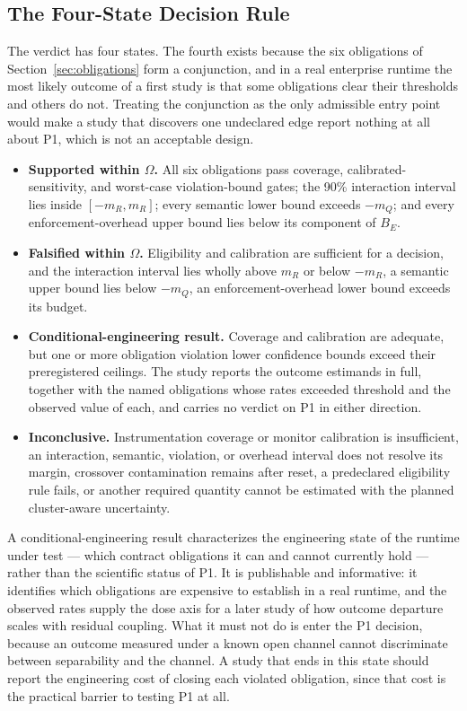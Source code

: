 \documentclass[11pt]{article}
\begin{document}
\subsection{The Four-State Decision Rule}
\label{sec:decision-rule}

The verdict has four states. The fourth exists because the six obligations of Section~\ref{sec:obligations} form a conjunction, and in a real enterprise runtime the most likely outcome of a first study is that some obligations clear their thresholds and others do not. Treating the conjunction as the only admissible entry point would make a study that discovers one undeclared edge report nothing at all about P1, which is not an acceptable design.

\begin{itemize}
\item \textbf{Supported within $\Omega$.} All six obligations pass coverage, calibrated-sensitivity, and worst-case violation-bound gates; the 90\% interaction interval lies inside $[-m_R,m_R]$; every semantic lower bound exceeds $-m_Q$; and every enforcement-overhead upper bound lies below its component of $B_E$.
\item \textbf{Falsified within $\Omega$.} Eligibility and calibration are sufficient for a decision, and the interaction interval lies wholly above $m_R$ or below $-m_R$, a semantic upper bound lies below $-m_Q$, an enforcement-overhead lower bound exceeds its budget.
\item \textbf{Conditional-engineering result.} Coverage and calibration are adequate, but one or more obligation violation lower confidence bounds exceed their preregistered ceilings. The study reports the outcome estimands in full, together with the named obligations whose rates exceeded threshold and the observed value of each, and carries no verdict on P1 in either direction.
\item \textbf{Inconclusive.} Instrumentation coverage or monitor calibration is insufficient, an interaction, semantic, violation, or overhead interval does not resolve its margin, crossover contamination remains after reset, a predeclared eligibility rule fails, or another required quantity cannot be estimated with the planned cluster-aware uncertainty.
\end{itemize}

A conditional-engineering result characterizes the engineering state of the runtime under test --- which contract obligations it can and cannot currently hold --- rather than the scientific status of P1. It is publishable and informative: it identifies which obligations are expensive to establish in a real runtime, and the observed rates supply the dose axis for a later study of how outcome departure scales with residual coupling. What it must not do is enter the P1 decision, because an outcome measured under a known open channel cannot discriminate between separability and the channel. A study that ends in this state should report the engineering cost of closing each violated obligation, since that cost is the practical barrier to testing P1 at all.
\end{document}
